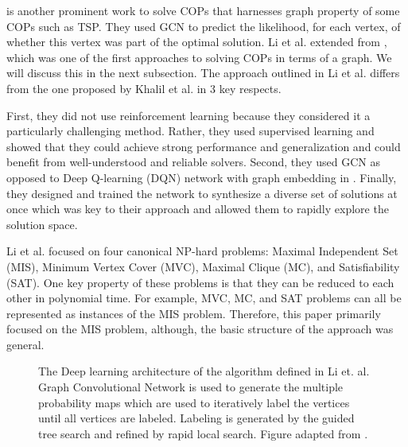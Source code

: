 \documentclass{article}
\begin{document}
\cite{li2018combinatorial} is another prominent work to solve COPs that harnesses graph property of some COPs such as TSP. They used GCN to predict the likelihood, for each vertex, of whether this vertex was part of the optimal solution. Li et al. extended from \cite{khalil2017learning}, which was one of the first approaches to solving COPs in terms of a graph. We will discuss this in the next subsection. The approach outlined in Li et al. differs from the one proposed by Khalil et al. in 3 key respects.

First, they did not use reinforcement learning because they considered it a particularly challenging method. Rather, they used supervised learning and showed that they could achieve strong performance and generalization and could benefit from well-understood and reliable solvers. Second, they used GCN as opposed to Deep Q-learning (DQN) network with graph embedding in \cite{khalil2017learning}. Finally, they designed and trained the network to synthesize a diverse set of solutions at once which was key to their approach and allowed them to rapidly explore the solution space. 

Li et al. focused on four canonical NP-hard problems: Maximal Independent Set (MIS), Minimum Vertex Cover (MVC), Maximal Clique (MC), and Satisfiability (SAT). One key property of these problems is that they can be reduced to each other \cite{karp1972reducibility} in polynomial time. For example, MVC, MC, and SAT problems can all be represented as instances of the MIS problem. Therefore, this paper primarily focused on the MIS problem, although, the basic structure of the approach was general. 

\begin{figure}
    \caption{The Deep learning architecture of the algorithm defined in Li et. al. Graph Convolutional Network is used to generate the multiple probability maps which are used to iteratively label the vertices until all vertices are labeled. Labeling is generated by the guided tree search and refined by rapid local search. Figure adapted from \cite{li2018combinatorial}.}
    \label{fig:GCN}
\end{figure}
\end{document}
